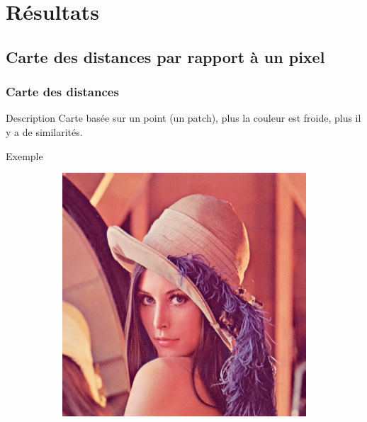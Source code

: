 \documentclass{beamer}
\begin{document}
\section{Résultats}
\subsection{Carte des distances par rapport à un pixel}
\begin{frame}
    \frametitle{Carte des distances}
    \begin{block}{Description}
        Carte basée sur un point (un patch), plus la couleur est froide, plus il y a de similarités.
    \end{block}
    \begin{exampleblock}{Exemple}
        \begin{figure}[h]
            \centering
            \begin{subfigure}{0.3\textwidth}
                \includegraphics[width=\textwidth]{img/lena}
                \caption{}
            \end{subfigure}
            \begin{subfigure}{0.3\textwidth}

\end{subfigure}
\end{figure}
\end{exampleblock}
\end{frame}
\end{document}
